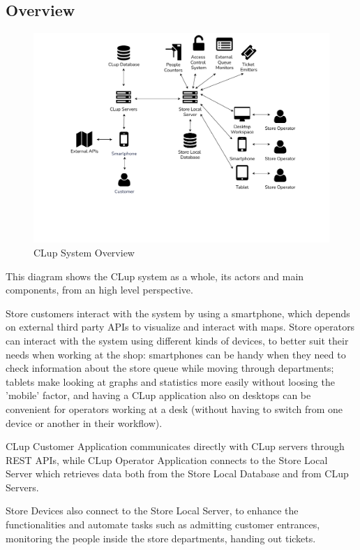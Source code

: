 \subsection{Overview}
\begin{figure}[H]
    \hspace{-3cm}
    \includegraphics[width=1.3\textwidth]{Images/overview.pdf}
    \caption{\label{fig:Overview} CLup System Overview}
\end{figure}

This diagram shows the CLup system as a whole, its actors and main components, from an high level perspective.

Store customers interact with the system by using a smartphone, which depends on external third party APIs to visualize and interact with maps.
Store operators can interact with the system using different kinds of devices, to better suit their needs when working at the shop: smartphones can be handy when they need to check information about the store queue while moving through departments; tablets make looking at graphs and statistics more easily without loosing the 'mobile' factor, and having a CLup application also on desktops can be convenient for operators working at a desk (without having to switch from one device or another in their workflow).

CLup Customer Application communicates directly with CLup servers through REST APIs, while CLup Operator Application connects to the Store Local Server which retrieves data both from the Store Local Database and from CLup Servers.

Store Devices also connect to the Store Local Server, to enhance the functionalities and automate tasks such as admitting customer entrances, monitoring the people inside the store departments, handing out tickets.

